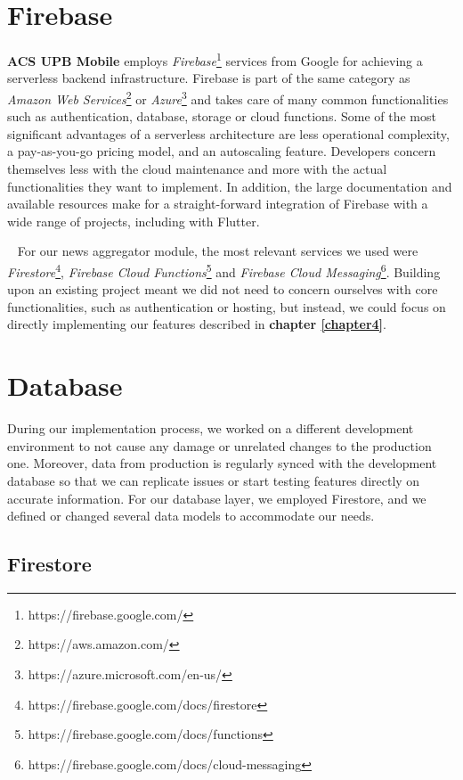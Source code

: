\section{Firebase}

\textbf{ACS UPB Mobile} employs \textit{Firebase}\footnote{https://firebase.google.com/} services from Google for achieving a serverless backend infrastructure. Firebase is part of the same category as \textit{Amazon Web Services}\footnote{https://aws.amazon.com/} or \textit{Azure}\footnote{https://azure.microsoft.com/en-us/} and takes care of many common functionalities such as authentication, database, storage or cloud functions. Some of the most significant advantages of a serverless architecture are less operational complexity, a pay-as-you-go pricing model, and an autoscaling feature. Developers concern themselves less with the cloud maintenance and more with the actual functionalities they want to implement. In addition, the large documentation and available resources make for a straight-forward integration of Firebase with a wide range of projects, including with Flutter.

~
For our news aggregator module, the most relevant services we used were \textit{Firestore}\footnote{https://firebase.google.com/docs/firestore}, \textit{Firebase Cloud Functions}\footnote{https://firebase.google.com/docs/functions} and \textit{Firebase Cloud Messaging}\footnote{https://firebase.google.com/docs/cloud-messaging}. Building upon an existing project meant we did not need to concern ourselves with core functionalities, such as authentication or hosting, but instead, we could focus on directly implementing our features described in \textbf{chapter \ref{chapter4}}.

\section{Database}

During our implementation process, we worked on a different development environment to not cause any damage or unrelated changes to the production one. Moreover, data from production is regularly synced with the development database so that we can replicate issues or start testing features directly on accurate information. For our database layer, we employed Firestore, and we defined or changed several data models to accommodate our needs.

\subsection{Firestore}

